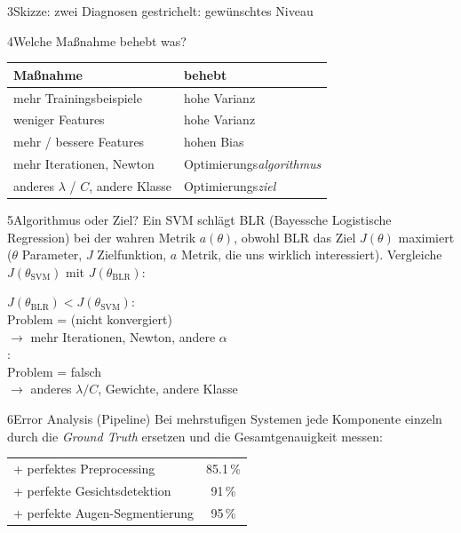 \begin{hngrid}
\begin{hnp}[raster multicolumn=2,acc=hnteal]{3}{Skizze: zwei Diagnosen}
{\tiny gestrichelt: gewünschtes Niveau}
\end{hnp}
%
\begin{hnp}[raster multicolumn=3,acc=hnnavy]{4}{Welche Maßnahme behebt was?}
\renewcommand{\arraystretch}{1.22}
\begin{tabular}{@{}p{4.0cm}p{4.4cm}@{}}
\hline
\textbf{Maßnahme}&\textbf{behebt}\\\hline
mehr Trainingsbeispiele&hohe Varianz\\
weniger Features&hohe Varianz\\
mehr / bessere Features&hohen Bias\\
mehr Iterationen, Newton&Optimierungs\emph{algorithmus}\\
anderes $\lambda$ / $C$, andere Klasse&Optimierungs\emph{ziel}\\\hline
\end{tabular}
\end{hnp}
%
\begin{hnp}[raster multicolumn=3,acc=hngreen]{5}{Algorithmus oder Ziel?}
Ein SVM schlägt BLR (Bayessche Logistische Regression) bei der wahren Metrik $a(\theta)$, obwohl BLR das Ziel $J(\theta)$ maximiert ($\theta$ Parameter, $J$ Zielfunktion, $a$ Metrik, die uns wirklich interessiert). Vergleiche $J(\theta_{\mathrm{SVM}})$ mit $J(\theta_{\mathrm{BLR}})$:
\begin{pcode}[Diagnose]
 $J(\theta_{\mathrm{BLR}})<J(\theta_{\mathrm{SVM}})$:\\
\hii Problem =  (nicht konvergiert)\\
\hii $\to$ mehr Iterationen, Newton, andere $\alpha$\\
: \ \\
\hii Problem =  falsch\\
\hii $\to$ anderes $\lambda/C$, Gewichte, andere Klasse
\end{pcode}
\end{hnp}
%
\begin{hnp}[raster multicolumn=3,acc=hnrose]{6}{Error Analysis (Pipeline)}
Bei mehrstufigen Systemen jede Komponente einzeln durch die \emph{Ground Truth} ersetzen und die Gesamtgenauigkeit messen:
\renewcommand{\arraystretch}{1.15}
\begin{tabular}{@{}lc@{}}
\hline
+ perfektes Preprocessing&85.1\,\%\\
+ perfekte Gesichtsdetektion&91\,\%\\
+ perfekte Augen-Segmentierung&95\,\%\\\hline

\end{tabular}
\end{hnp}
\end{hngrid}

